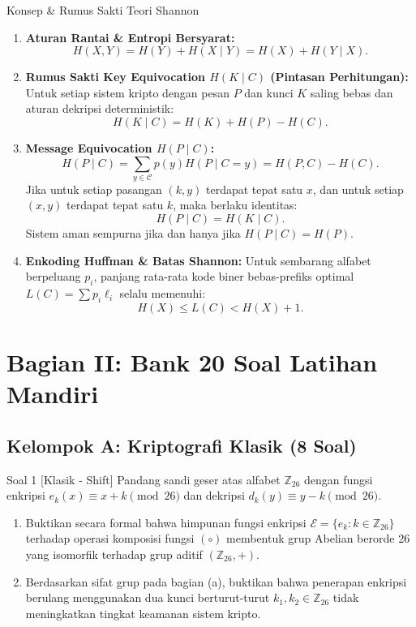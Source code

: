 \documentclass[11pt,a4paper]{article}
\begin{document}
\begin{teoribox}{Konsep \& Rumus Sakti Teori Shannon}
\begin{enumerate}[leftmargin=*]
    \item \textbf{Aturan Rantai \& Entropi Bersyarat:}
    \[
    H(X, Y) = H(Y) + H(X \mid Y) = H(X) + H(Y \mid X).
    \]
    
    \item \textbf{Rumus Sakti Key Equivocation $H(K \mid C)$ (Pintasan Perhitungan):}
    Untuk setiap sistem kripto dengan pesan $P$ dan kunci $K$ saling bebas dan aturan dekripsi deterministik:
    \[
    H(K \mid C) = H(K) + H(P) - H(C).
    \]
    
    \item \textbf{Message Equivocation $H(P \mid C)$:}
    \[
    H(P \mid C) = \sum_{y \in \mathcal{C}} p(y) H(P \mid C = y) = H(P, C) - H(C).
    \]
    Jika untuk setiap pasangan $(k, y)$ terdapat tepat satu $x$, dan untuk setiap $(x, y)$ terdapat tepat satu $k$, maka berlaku identitas:
    \[
    H(P \mid C) = H(K \mid C).
    \]
    Sistem aman sempurna jika dan hanya jika $H(P \mid C) = H(P)$.
    
    \item \textbf{Enkoding Huffman \& Batas Shannon:} Untuk sembarang alfabet berpeluang $p_i$, panjang rata-rata kode biner bebas-prefiks optimal $L(C) = \sum p_i \ell_i$ selalu memenuhi:
    \[
    H(X) \le L(C) < H(X) + 1.
    \]
\end{enumerate}
\end{teoribox}

\newpage
\section{Bagian II: Bank 20 Soal Latihan Mandiri}

\subsection{Kelompok A: Kriptografi Klasik (8 Soal)}

\begin{soalklasik}{Soal 1 [Klasik - Shift]}
Pandang sandi geser atas alfabet $\mathbb{Z}_{26}$ dengan fungsi enkripsi $e_k(x) \equiv x + k \pmod{26}$ dan dekripsi $d_k(y) \equiv y - k \pmod{26}$.
\begin{enumerate}[label=(\alph*)]
    \item Buktikan secara formal bahwa himpunan fungsi enkripsi $\mathcal{E} = \{e_k : k \in \mathbb{Z}_{26}\}$ terhadap operasi komposisi fungsi $(\circ)$ membentuk grup Abelian berorde 26 yang isomorfik terhadap grup aditif $(\mathbb{Z}_{26}, +)$.
    \item Berdasarkan sifat grup pada bagian (a), buktikan bahwa penerapan enkripsi berulang menggunakan dua kunci berturut-turut $k_1, k_2 \in \mathbb{Z}_{26}$ tidak meningkatkan tingkat keamanan sistem kripto.
\end{enumerate}
\end{soalklasik}
\end{document}

